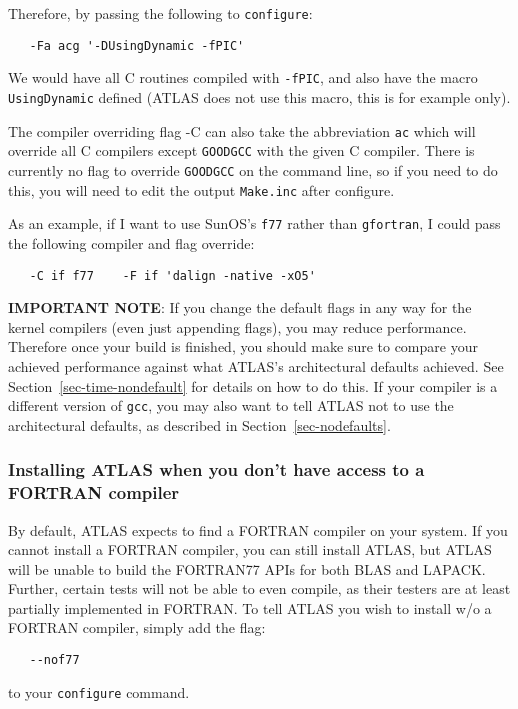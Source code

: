 \documentclass[11pt]{article}
\begin{document}
Therefore, by passing the following to {\tt configure}:
\vspace*{-0.1in}
\begin{verbatim}
   -Fa acg '-DUsingDynamic -fPIC'
\end{verbatim}

We would have all C routines compiled with {\tt -fPIC}, and also have the
macro {\tt UsingDynamic} defined (ATLAS does not use this macro, this is
for example only).

The compiler overriding flag {-C} can also take the abbreviation {\tt ac}
which will override all C compilers except {\tt GOODGCC} with the given
C compiler.  There is currently no flag to override {\tt GOODGCC} on
the command line, so if you need to do this, you will need to edit the
output {\tt Make.inc} after configure.

As an example, if I want to use SunOS's {\tt f77} rather than {\tt gfortran},
I could pass the following compiler and flag override:
\vspace*{-0.1in}
\begin{verbatim}
   -C if f77    -F if 'dalign -native -xO5'
\end{verbatim}

{\bf IMPORTANT NOTE}: If you change the default flags in any way for
the kernel compilers
(even just appending flags), you may reduce performance.  Therefore once
your build is finished, you should make sure to compare your achieved
performance against what ATLAS's architectural defaults achieved.  See
Section~\ref{sec-time-nondefault} for details on how to do this.
If your compiler is a different version of {\tt gcc}, you may also
want to tell ATLAS not to use the architectural defaults, as described
in Section~\ref{sec-nodefaults}.

\subsubsection{Installing ATLAS when you don't have access to a FORTRAN
compiler}
\label{sec-nof77}

By default, ATLAS expects to find a FORTRAN compiler on your system.  If
you cannot install a FORTRAN compiler, you can still install ATLAS, but
ATLAS will be unable to build the FORTRAN77 APIs for both BLAS and LAPACK.
Further, certain tests will not be able to even compile, as their testers
are at least partially implemented in FORTRAN.  To tell ATLAS you wish
to install w/o a FORTRAN compiler, simply add the flag:
\vspace*{-0.1in}
\begin{verbatim}
   --nof77
\end{verbatim}
to your {\tt configure} command.
\end{document}
